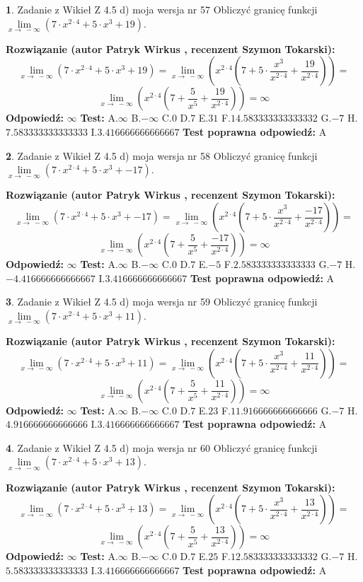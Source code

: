 \documentclass[12pt, a4paper]{article}
\theoremstyle{definition} %
\newtheorem{zad}{}
\newcommand{\zadStart}[1]{\begin{zad}#1\newline}
\newcommand{\zadStop}{\end{zad}}
\newcommand{\rozwStart}[2]{\noindent \textbf{Rozwiązanie (autor #1 , recenzent #2): }\newline}
\newcommand{\rozwStop}{\newline}
\newcommand{\odpStart}{\noindent \textbf{Odpowiedź:}\newline}
\newcommand{\odpStop}{\newline}
\newcommand{\testStart}{\noindent \textbf{Test:}\newline}
\newcommand{\testStop}{\newline}
\newcommand{\kluczStart}{\noindent \textbf{Test poprawna odpowiedź:}\newline}
\newcommand{\kluczStop}{\newline}
\begin{document}
\zadStart{Zadanie z Wikieł Z 4.5 d) moja wersja nr 57}
Obliczyć granicę funkcji  $\lim\limits_{x\to\ -\infty}(7 \cdot x^{2\cdot4}+5 \cdot x^{3}+19)$.
\zadStop
\rozwStart{Patryk Wirkus}{Szymon Tokarski}
$$\lim\limits_{x\to\ -\infty}(7 \cdot x^{2\cdot4}+5 \cdot x^{3}+19) = \lim\limits_{x\to\ -\infty}(x^{2\cdot4}(7 +5 \cdot \frac{x^{3}}{x^{2\cdot4}}+\frac{19}{x^{2\cdot4}})) =$$ $$\lim\limits_{x\to\ -\infty}(x^{2\cdot4}(7 +\frac{5}{x^{5}}+\frac{19}{x^{2\cdot4}})) =\infty$$
\rozwStop
\odpStart
$\infty$
\odpStop
\testStart
A.$\infty$ B.$-\infty$ C.$0$ D.$7$ E.$31$
F.$14.583333333333332$ G.$-7$
H.$7.583333333333333$
I.$3.416666666666667$
\testStop
\kluczStart
A
\kluczStop



\zadStart{Zadanie z Wikieł Z 4.5 d) moja wersja nr 58}
Obliczyć granicę funkcji  $\lim\limits_{x\to\ -\infty}(7 \cdot x^{2\cdot4}+5 \cdot x^{3}+-17)$.
\zadStop
\rozwStart{Patryk Wirkus}{Szymon Tokarski}
$$\lim\limits_{x\to\ -\infty}(7 \cdot x^{2\cdot4}+5 \cdot x^{3}+-17) = \lim\limits_{x\to\ -\infty}(x^{2\cdot4}(7 +5 \cdot \frac{x^{3}}{x^{2\cdot4}}+\frac{-17}{x^{2\cdot4}})) =$$ $$\lim\limits_{x\to\ -\infty}(x^{2\cdot4}(7 +\frac{5}{x^{5}}+\frac{-17}{x^{2\cdot4}})) =\infty$$
\rozwStop
\odpStart
$\infty$
\odpStop
\testStart
A.$\infty$ B.$-\infty$ C.$0$ D.$7$ E.$-5$
F.$2.583333333333333$ G.$-7$
H.$-4.416666666666667$
I.$3.416666666666667$
\testStop
\kluczStart
A
\kluczStop



\zadStart{Zadanie z Wikieł Z 4.5 d) moja wersja nr 59}
Obliczyć granicę funkcji  $\lim\limits_{x\to\ -\infty}(7 \cdot x^{2\cdot4}+5 \cdot x^{3}+11)$.
\zadStop
\rozwStart{Patryk Wirkus}{Szymon Tokarski}
$$\lim\limits_{x\to\ -\infty}(7 \cdot x^{2\cdot4}+5 \cdot x^{3}+11) = \lim\limits_{x\to\ -\infty}(x^{2\cdot4}(7 +5 \cdot \frac{x^{3}}{x^{2\cdot4}}+\frac{11}{x^{2\cdot4}})) =$$ $$\lim\limits_{x\to\ -\infty}(x^{2\cdot4}(7 +\frac{5}{x^{5}}+\frac{11}{x^{2\cdot4}})) =\infty$$
\rozwStop
\odpStart
$\infty$
\odpStop
\testStart
A.$\infty$ B.$-\infty$ C.$0$ D.$7$ E.$23$
F.$11.916666666666666$ G.$-7$
H.$4.916666666666666$
I.$3.416666666666667$
\testStop
\kluczStart
A
\kluczStop



\zadStart{Zadanie z Wikieł Z 4.5 d) moja wersja nr 60}
Obliczyć granicę funkcji  $\lim\limits_{x\to\ -\infty}(7 \cdot x^{2\cdot4}+5 \cdot x^{3}+13)$.
\zadStop
\rozwStart{Patryk Wirkus}{Szymon Tokarski}
$$\lim\limits_{x\to\ -\infty}(7 \cdot x^{2\cdot4}+5 \cdot x^{3}+13) = \lim\limits_{x\to\ -\infty}(x^{2\cdot4}(7 +5 \cdot \frac{x^{3}}{x^{2\cdot4}}+\frac{13}{x^{2\cdot4}})) =$$ $$\lim\limits_{x\to\ -\infty}(x^{2\cdot4}(7 +\frac{5}{x^{5}}+\frac{13}{x^{2\cdot4}})) =\infty$$
\rozwStop
\odpStart
$\infty$
\odpStop
\testStart
A.$\infty$ B.$-\infty$ C.$0$ D.$7$ E.$25$
F.$12.583333333333332$ G.$-7$
H.$5.583333333333333$
I.$3.416666666666667$
\testStop
\kluczStart
A
\kluczStop
\end{document}

